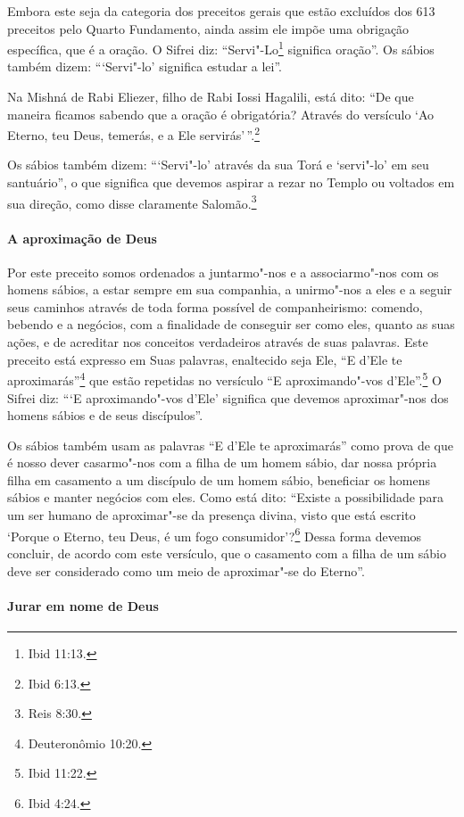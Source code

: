 \begin{multicols}{2}
Embora este seja da categoria dos preceitos gerais que estão excluídos dos 613 preceitos pelo Quarto Fundamento, ainda assim ele impõe uma obrigação
específica, que é a oração. O Sifrei\starr{} diz: ``Servi"-Lo\footnote{Ibid 11:13.}
significa oração''. Os sábios também dizem: ```Servi"-lo' significa
estudar a lei''.

Na Mishná de Rabi Eliezer\starr, filho de Rabi Iossi Hagalili\starr, está dito:
``De que maneira ficamos sabendo que a oração é obrigatória? Através do
versículo `Ao Eterno, teu Deus, temerás, e a Ele servirás'\,''.\footnote{Ibid
6:13.}

Os sábios também dizem: ```Servi"-lo' através da sua Torá\starr{} e
`servi"-lo' em seu santuário'', o que significa que devemos aspirar a
rezar no Templo ou voltados em sua direção, como disse claramente
Salomão.\footnote{Reis 8:30.}

\paragraph{A aproximação de Deus}

Por este preceito somos ordenados a juntarmo"-nos e a associarmo"-nos com
os homens sábios, a estar sempre em sua companhia, a unirmo"-nos a eles e
a seguir seus caminhos através de toda forma possível de
companheirismo: comendo, bebendo e a negócios, com a finalidade de
conseguir ser como eles, quanto as suas ações, e de acreditar nos
conceitos verdadeiros através de suas palavras. Este preceito está
expresso em Suas palavras, enaltecido seja Ele, ``E d'Ele te
aproximarás''\footnote{Deuteronômio 10:20.} que estão 
repetidas no versículo ``E aproximando"-vos d'Ele''.\footnote{Ibid 11:22.}
O Sifrei\starr{} diz: ```E aproximando"-vos d'Ele' significa que devemos aproximar"-nos dos homens sábios e de seus discípulos''.

Os sábios também usam as palavras ``E d'Ele te aproximarás'' como prova
de que é nosso dever casarmo"-nos com a filha de um homem sábio, dar
nossa própria filha em casamento a um discípulo de um homem sábio,
beneficiar os homens sábios e manter negócios com eles. Como está dito:
``Existe a possibilidade para um ser humano de aproximar"-se da presença
divina, visto que está escrito `Porque o Eterno, teu Deus, é um fogo
consumidor'?\footnote{Ibid 4:24.} Dessa forma devemos concluir, de acordo com
este versículo, que o casamento com a filha de um sábio deve ser
considerado como um meio de aproximar"-se do Eterno''.

\paragraph{Jurar em nome de Deus}


\end{multicols}
